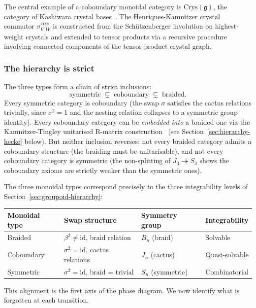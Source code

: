 \noindent
The central example of a coboundary monoidal category is
$\mathrm{Crys}(\mathfrak{g})$, the category of Kashiwara crystal
bases~\cite{kashiwara-1990}.  The Henriques-Kamnitzer crystal
commutor $\sigma_{V,W}^{\mathrm{crys}}$ is constructed from the
Sch\"utzenberger involution on highest-weight crystals and extended
to tensor products via a recursive procedure involving connected
components of the tensor product crystal graph.

\subsubsection*{The hierarchy is strict}

The three types form a chain of strict inclusions:
\[
  \text{symmetric} \;\subsetneq\; \text{coboundary}
  \;\subsetneq\; \text{braided}.
\]
Every symmetric category is coboundary (the swap $\sigma$ satisfies
the cactus relations trivially, since $\sigma^2 = 1$ and the nesting
relation collapses to a symmetric group identity).  Every coboundary
category can be \emph{embedded into} a braided one via the
Kamnitzer-Tingley unitarised R-matrix
construction~\cite{kamnitzer-tingley-2007} (see
Section~\ref{sec:hierarchy-hecke} below).  But neither inclusion
reverses: not every braided category admits a coboundary structure
(the braiding must be unitarisable), and not every coboundary category
is symmetric (the non-splitting of $J_3 \twoheadrightarrow S_3$ shows
the coboundary axioms are strictly weaker than the symmetric ones).

The three monoidal types correspond precisely to the three integrability
levels of Section~\ref{sec:groupoid-hierarchy}:
\begin{center}
\renewcommand{\arraystretch}{1.3}
\begin{tabular}{llll}
\toprule
\textbf{Monoidal type} & \textbf{Swap structure} & \textbf{Symmetry group}
  & \textbf{Integrability} \\
\midrule
Braided & $\beta^2 \neq \mathrm{id}$, braid relation &
  $B_n$ (braid) & Solvable \\
Coboundary & $\sigma^2 = \mathrm{id}$, cactus relations &
  $J_n$ (cactus) & Quasi-solvable \\
Symmetric & $\sigma^2 = \mathrm{id}$, braid = trivial &
  $S_n$ (symmetric) & Combinatorial \\
\bottomrule
\end{tabular}
\end{center}

\noindent
This alignment is the first axis of the phase diagram.  We now identify
what is forgotten at each transition.


